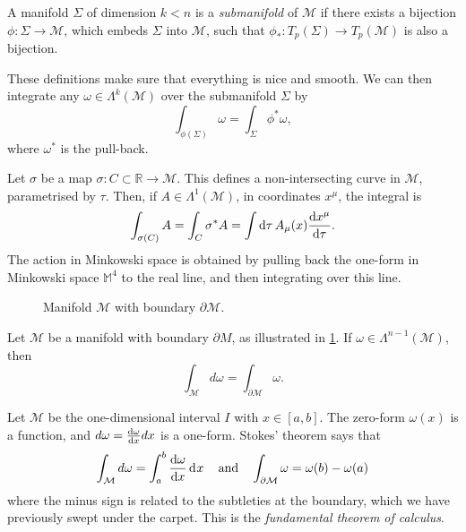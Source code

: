 \begin{definition}[submanifold]
  A manifold $\Sigma$ of dimension $k < n$ is a \emph{submanifold} of $\mathcal{M}$ if there exists a bijection $\phi\colon \Sigma \to \mathcal{M}$, which embeds $\Sigma$ into $\mathcal{M}$, such that $\phi_*\colon T_p(\Sigma) \to T_p(\mathcal{M})$ is also a bijection.
\end{definition}
These definitions make sure that everything is nice and smooth.
We can then integrate any $\omega \in \Lambda^k(\mathcal{M})$ over the submanifold $\Sigma$ by
\begin{equation}
  \int_{\phi(\Sigma)} \omega = \int_{\Sigma} \phi^* \omega,
\end{equation}
where $\omega^*$ is the pull-back.

\begin{example}[]
  Let $\sigma$ be a map $\sigma \colon C \subset \mathbb{R} \to \mathcal{M}$. This defines a non-intersecting curve in $\mathcal{M}$, parametrised by $\tau$. Then, if $A \in \Lambda^1(\mathcal{M})$, in coordinates $x^\mu$, the integral is
  \begin{equation}
    \int_{\sigma(C)} A = \int_{C}\sigma^* A = \int \dd{\tau} A_\mu (x) \dv{x^\mu}{\tau}.
  \end{equation}
  The action in Minkowski space is obtained by pulling back the one-form in Minkowski space $\mathbb{M}^4$ to the real line, and then integrating over this line.
\end{example}

\begin{figure}[tbhp]
  \centering
  \def\svgwidth{0.5\columnwidth}
  
  \caption{Manifold $\mathcal{M}$ with boundary $\partial \mathcal{M}$.}
  \label{fig:mfdwboundary}
\end{figure}

\begin{theorem}
  Let $\mathcal{M}$ be a manifold with boundary $\partial M$, as illustrated in \ref{fig:mfdwboundary}.
  If $\omega \in \Lambda^{n-1}(\mathcal{M})$, then
  \begin{equation}
    \int_{\mathcal{M}} d\omega = \int_{\partial \mathcal{M}} \omega.
  \end{equation}
\end{theorem}

\begin{example}[]
  Let $\mathcal{M}$ be the one-dimensional interval $I$ with $x \in [a, b]$. The zero-form $\omega(x)$ is a function, and $d\omega = \dv{\omega}{x} dx$ is a one-form.
  Stokes' theorem says that
  \begin{equation}
    \int_{\mathcal{M}} d\omega = \int_{a}^{b} \dv{\omega}{x} \dd[]{x} \quad \text{and} \quad 
    \int_{\partial \mathcal{M}} \omega = \omega(b) - \omega(a)
  \end{equation}
  where the minus sign is related to the subtleties at the boundary, which we have previously swept under the carpet.
  This is the \emph{fundamental theorem of calculus}.
\end{example}

